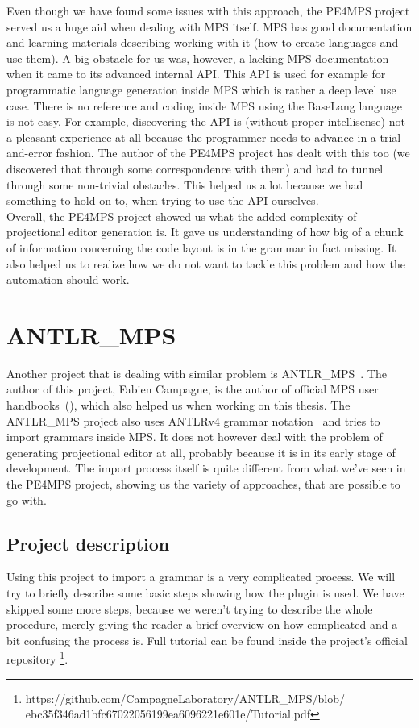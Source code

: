 Even though we have found some issues with this approach, the PE4MPS project served us a huge aid when dealing with MPS itself. MPS has good documentation and learning materials describing working with it (how to create languages and use them). A big obstacle for us was, however, a lacking MPS documentation when it came to its advanced internal API. This API is used for example for programmatic language generation inside MPS which is rather a deep level use case. There is no reference and coding inside MPS using the BaseLang language is not easy. For example, discovering the API is (without proper intellisense) not a pleasant experience at all because the programmer needs to advance in a trial-and-error fashion. The author of the PE4MPS project has dealt with this too (we discovered that through some correspondence with them) and had to tunnel through some non-trivial obstacles. This helped us a lot because we had something to hold on to, when trying to use the API ourselves.
\\

Overall, the PE4MPS project showed us what the added complexity of projectional editor generation is. It gave us understanding of how big of a chunk of information concerning the code layout is in the grammar in fact missing. It also helped us to realize how we do not want to tackle this problem and how the automation should work.

\section{ANTLR{\_}MPS}
Another project that is dealing with similar problem is ANTLR{\_}MPS~\cite{ANTLR2MPS}. The author of this project, Fabien Campagne, is the author of official MPS user handbooks~(\cite{MPS1}\cite{MPS2}), which also helped us when working on this thesis. The ANTLR{\_}MPS project also uses ANTLRv4 grammar notation~\cite{ANTLR4} and tries to import grammars inside MPS. It does not however deal with the problem of generating projectional editor at all, probably because it is in its early stage of development. The import process itself is quite different from what we've seen in the PE4MPS project, showing us the variety of approaches, that are possible to go with.

\subsection{Project description}
Using this project to import a grammar is a very complicated process. We will try to briefly describe some basic steps showing how the plugin is used. We have skipped some more steps, because we weren't trying to describe the whole procedure, merely giving the reader a brief overview on how complicated and a bit confusing the process is. Full tutorial can be found inside the project's official repository \footnote{https://github.com/CampagneLaboratory/ANTLR{\_}MPS/blob/ ebc35f346ad1bfc67022056199ea6096221e601e/Tutorial.pdf}.
\\

